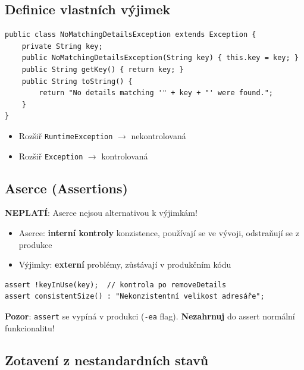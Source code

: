 \documentclass[11pt,a4paper]{article}
\begin{document}
\subsection{Definice vlastních výjimek}

\begin{verbatim}
public class NoMatchingDetailsException extends Exception {
    private String key;
    public NoMatchingDetailsException(String key) { this.key = key; }
    public String getKey() { return key; }
    public String toString() {
        return "No details matching '" + key + "' were found.";
    }
}
\end{verbatim}

\begin{tcolorbox}[tipbox,title=Pravidlo pro výběr nadtypu]
\begin{itemize}
    \item Rozšiř \texttt{RuntimeException} $\rightarrow$ nekontrolovaná
    \item Rozšiř \texttt{Exception} $\rightarrow$ kontrolovaná
\end{itemize}
\end{tcolorbox}

\subsection{Aserce (Assertions)}

\begin{tcolorbox}[warnbox,title=Assertions vs. Výjimky]
\textbf{NEPLATÍ}: Aserce nejsou alternativou k výjimkám!
\begin{itemize}
    \item Aserce: \textbf{interní kontroly} konzistence, používají se ve vývoji, odstraňují se z produkce
    \item Výjimky: \textbf{externí} problémy, zůstávají v produkčním kódu
\end{itemize}
\end{tcolorbox}

\begin{verbatim}
assert !keyInUse(key);  // kontrola po removeDetails
assert consistentSize() : "Nekonzistentní velikost adresáře";
\end{verbatim}

\textbf{Pozor}: \texttt{assert} se vypíná v produkci (\texttt{-ea} flag). \textbf{Nezahrnuj} do assert normální funkcionalitu!

\subsection{Zotavení z nestandardních stavů}
\end{document}
